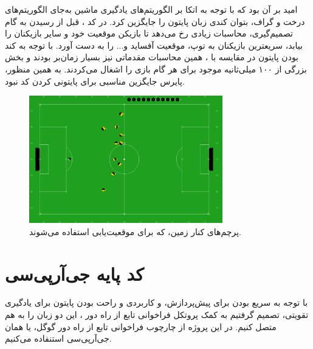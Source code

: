 امید بر آن بود که با توجه به اتکا بر الگوریتم‌های یادگیری ماشین به‌جای الگوریتم‌های درخت و گراف، بتوان کندی زبان پایتون را جایگزین کرد.
در کد ،
قبل از رسیدن به گام تصمیم‌گیری، محاسبات زیادی رخ می‌دهد تا بازیکن موقعیت خود و سایر بازیکنان را بیابد، سریعترین بازیکنان به توپ، موقعیت آفساید و... را به دست آورد.
با توجه به کند بودن پایتون در مقایسه با ،
همین محاسبات مقدماتی نیز بسیار زمان‌بر بودند و بخش بزرگی از ۱۰۰ میلی‌ثانیه موجود برای هر گام بازی را اشغال می‌کردند.
به همین منظور، پایرس جایگزین مناسبی برای پایتونی کردن کد نبود.

\begin{figure}[H]
    \centering
    \includegraphics[width=0.75\textwidth]{images/flags.png}
    \caption{پرچم‌های کنار زمین، که برای موقعیت‌یابی استفاده می‌شوند.}\label{fig:flags}
    
\end{figure}

\section{کد پایه جی‌آر‌پی‌سی}
با توجه به سریع بودن  
برای پیش‌پردازش،
و کاربردی و راحت بودن پایتون برای یادگیری تقویتی،
تصمیم گرفتیم به کمک پروتکل فراخوانی تابع از راه دور ،
این دو زبان را به هم متصل کنیم.
 در این پروژه از چارچوب فراخوانی تابع از راه دور گوگل، یا همان جی‌آر‌پی‌سی 
 استنفاده می‌کنیم.


